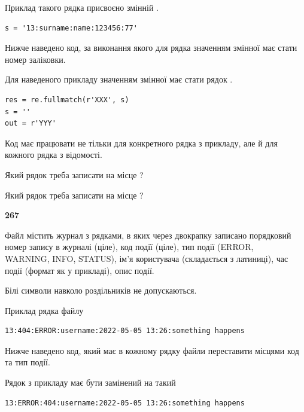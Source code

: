 Приклад такого рядка присвоєно змінній .



\begin{verbatim}
s = '13:surname:name:123456:77'
\end{verbatim}


Нижче наведено код, за виконання якого для рядка  значенням змінної  має стати номер заліковки.

Для наведеного прикладу значенням змінної  має стати рядок  .



\begin{verbatim}
res = re.fullmatch(r'XXX', s)
s = ''
out = r'YYY'
\end{verbatim}


Код має працювати не тільки для конкретного рядка з прикладу, але й для кожного рядка з відомості.




Який рядок треба записати на місце  ?\par
\vspace{5mm}


Який рядок треба записати на місце  ?\par


\newpage

{\begin {center}\textbf{ 267}\end {center}}\par
Файл  містить журнал з рядками, в яких через двокрапку записано поряд\-ко\-вий номер запису в журналі (ціле), код події (ціле), тип події (ERROR,\\ WARNING, INFO, STATUS), ім'я користувача (складається з латиниці), час події (фор\-мат як у прикладі), опис події.

Білі символи навколо роздільників не допускаються.

Приклад рядка файлу



\begin{verbatim}
13:404:ERROR:username:2022-05-05 13:26:something happens
\end{verbatim}


Нижче наведено код, який має в кожному рядку файли переставити місцями код та тип події.

Рядок з прикладу має бути замінений на такий



\begin{verbatim}
13:ERROR:404:username:2022-05-05 13:26:something happens
\end{verbatim}





